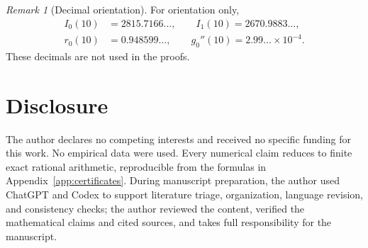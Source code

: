 \documentclass[preprint,12pt]{elsarticle}
\theoremstyle{plain}
\theoremstyle{definition}
\theoremstyle{remark}
\newtheorem{remark}[theorem]{Remark}
\begin{document}
\begin{remark}[Decimal orientation]\label{rem:appendix-decimals}
For orientation only,
\begin{equation}\label{eq:orientation-decimals}
\begin{aligned}
I_0(10)&=2815.7166\ldots,\qquad
I_1(10)=2670.9883\ldots,\\
r_0(10)&=0.948599\ldots,\qquad
g_0''(10)=2.99\ldots\times10^{-4}.
\end{aligned}
\end{equation}
These decimals are not used in the proofs.
\end{remark}

\section*{Disclosure}

The author declares no competing interests and received no specific funding
for this work. No empirical data were used. Every numerical claim reduces to
finite exact rational arithmetic, reproducible from the formulas in
Appendix~\ref{app:certificates}.
During manuscript preparation, the author used ChatGPT and Codex to support
literature triage, organization, language revision, and consistency checks;
the author reviewed the content, verified the mathematical claims and cited
sources, and takes full responsibility for the manuscript.
\end{document}
